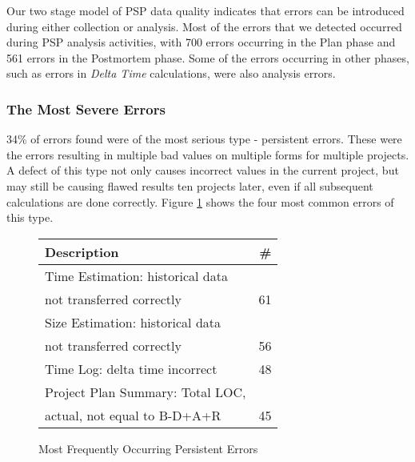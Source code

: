 Our two stage model of PSP data quality indicates that errors can be
introduced during either collection or analysis. 
Most of the errors that we detected occurred during PSP
analysis activities, with 700 errors occurring in the Plan phase and 561
errors in the Postmortem phase. Some of the errors occurring in other
phases, such as errors in {\it Delta Time} calculations, were also analysis
errors.

\subsubsection{The Most Severe Errors} 

34\% of errors found were of the most serious type - persistent errors.
These were the errors resulting in multiple bad values on multiple forms
for multiple projects.  A defect of this type not only causes incorrect
values in the current project, but may still be causing flawed results ten
projects later, even if all subsequent calculations are done correctly.
Figure \ref{errorsCommon} shows the four most common errors of this type.

\begin{figure} [htpb]
 
    \begin{center} 
    \begin{tabular}{|l|r|}\hline 
    Description & \# \\ \hline\hline 
    Time Estimation: historical data  &    \\ 
    not transferred correctly         & 61 \\ \hline
    Size Estimation: historical data  &    \\
    not transferred correctly         & 56 \\ \hline 
    
    Time Log: delta time incorrect    & 48 \\ \hline 
    Project Plan Summary: Total LOC,  &    \\
    actual, not equal to B-D+A+R      & 45 \\ \hline 
    \end{tabular}
    \end{center}  
    \caption{\label{errorsCommon} Most Frequently Occurring Persistent Errors}   
\end{figure}
    
